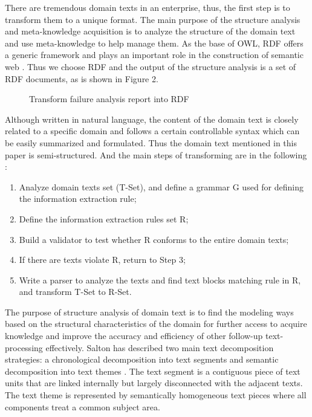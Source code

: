 \documentclass{elsarticle}
\begin{document}
There are tremendous domain texts in an enterprise, thus, the first step
is to transform them to a unique format. The main purpose of the
structure analysis and meta-knowledge acquisition is to analyze the
structure of the domain text and use meta-knowledge to help manage
them. As the base of OWL, RDF offers a generic framework and plays an
important role in the construction of semantic web \cite{lassila1999rdf}. Thus we
choose RDF and the output of the structure analysis is a set of RDF
documents, as is shown in Figure 2. 
\begin{figure}[htp]
  \centering
{}

  \caption{Transform failure analysis report into RDF}
  \label{fig:2}
\end{figure}
Although written in natural language, the content of the domain text
is closely related to a specific domain and follows a certain
controllable syntax which can be easily summarized and
formulated. Thus the domain text mentioned in this paper is
semi-structured. And the main steps of transforming are in the following \cite{Wang2008}:
\begin{enumerate}
\item Analyze domain texts set (T-Set), and define a grammar G used for
defining the information extraction rule;
\item Define the information extraction rules set R;
\item Build a validator to test whether R conforms to the entire domain
texts;
\item If there are texts violate R, return to Step 3;
\item Write a parser to analyze the texts and find text blocks
matching rule in R, and transform T-Set to R-Set.  
\end{enumerate}


The purpose of structure analysis of domain text is to find the
modeling ways based on the structural characteristics of the domain
for further access to acquire knowledge and improve
the accuracy and efficiency of other follow-up
text-processing effectively. Salton has described two main text decomposition
strategies: a chronological decomposition into text segments
and semantic decomposition into text themes \cite{234834}. The text segment is
a contiguous piece of text units that are linked internally but
largely disconnected with the adjacent texts. The text theme is
represented by semantically homogeneous text pieces where all
components treat a common subject area.
\end{document}
